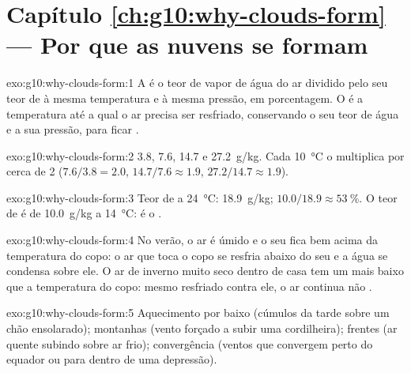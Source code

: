 \section*{Capítulo \ref{ch:g10:why-clouds-form} --- Por que as nuvens se formam}

\begin{solution}{exo:g10:why-clouds-form:1}
A  é o teor de vapor de água do ar dividido pelo seu teor de
 à mesma temperatura e à mesma pressão, em porcentagem. O  é a temperatura até a qual o ar precisa ser resfriado, conservando o
seu teor de água e a sua pressão, para ficar .
\end{solution}

\begin{solution}{exo:g10:why-clouds-form:2}
\num{3.8}, \num{7.6}, \num{14.7} e \qty{27.2}{g/kg}. Cada
\qty{10}{\degreeCelsius} o multiplica por cerca de 2 ($7.6/3.8 = 2.0$,
$14.7/7.6 \approx 1.9$, $27.2/14.7 \approx 1.9$).
\end{solution}

\begin{solution}{exo:g10:why-clouds-form:3}
Teor de  a \qty{24}{\degreeCelsius}: \qty{18.9}{g/kg};  $10.0/18.9 \approx \qty{53}{\percent}$. O teor de  é de
\qty{10.0}{g/kg} a \qty{14}{\degreeCelsius}: é o .
\end{solution}

\begin{solution}{exo:g10:why-clouds-form:4}
No verão, o ar é úmido e o seu  fica bem acima da
temperatura do copo: o ar que toca o copo se resfria abaixo do seu  e a água se condensa sobre ele. O ar de inverno muito seco dentro de
casa tem um  mais baixo que a temperatura do copo: mesmo
resfriado contra ele, o ar continua não .
\end{solution}

\begin{solution}{exo:g10:why-clouds-form:5}
Aquecimento por baixo (cúmulos da tarde sobre um chão ensolarado); montanhas
(vento forçado a subir uma cordilheira); frentes (ar quente subindo sobre ar
frio); convergência (ventos que convergem perto do equador ou para dentro de
uma depressão).
\end{solution}

